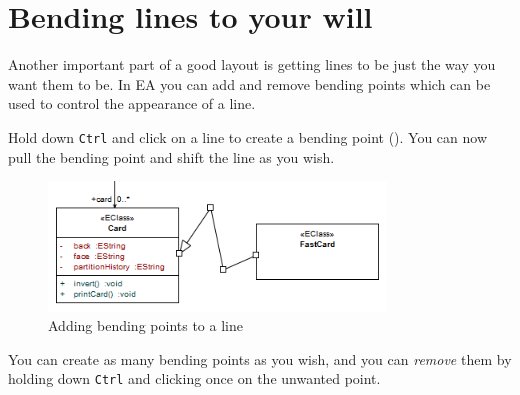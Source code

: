 \newpage

\section{Bending lines to your will}

Another important part of a good layout is getting lines to be just the way you want them to be. In EA you can add and remove bending points which can be used
to control the appearance of a line.

\begin{stepbystep}
\item Hold down \texttt{Ctrl} and click on a line to create a bending point (). You can now pull the bending point
and shift the line as you wish.
 
\begin{figure}[htbp]
\begin{center}
  \includegraphics[width=0.8\textwidth]{../../org.moflon.doc.handbook.05_miscellaneous/1_grokkingEA/02_bendingLines/ea_bendingLines}
  \caption{Adding bending points to a line}   
  \label{ea:bendLines}
\end{center}
\end{figure}

\item You can create as many bending points as you wish, and you can \emph{remove} them by holding down \texttt{Ctrl} and clicking once
on the unwanted point.
\end{stepbystep}
